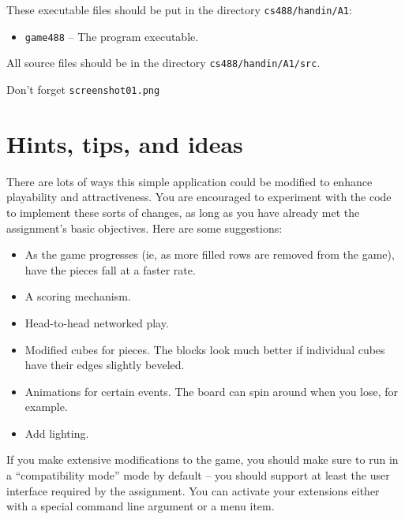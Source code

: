 These executable files should be put in the directory \texttt{cs488/handin/A1}:

\begin{itemize}
	\item \texttt{game488} -- The program executable.
\end{itemize}

All source files should be in the directory \texttt{cs488/handin/A1/src}.

Don't forget \texttt{screenshot01.png}

\section{Hints, tips, and ideas}

There are lots of ways this simple application could be modified
to enhance playability and attractiveness.  You are encouraged to
experiment with the code to implement these sorts of changes, as
long as you have already met the assignment's basic objectives.
Here are some suggestions:

\begin{itemize}
  \item As the game progresses (ie, as more filled rows are removed from
    the game), have the pieces fall at a faster rate.  

	\item A scoring mechanism.
	\item Head-to-head networked play.
	\item Modified cubes for pieces.  The blocks look much better
		  if individual cubes have their edges slightly beveled.
	\item Animations for certain events.  The board can spin around
		  when you lose, for example.
	\item Add lighting.
\end{itemize}

If you make extensive modifications to the game, you should make
sure to run in a ``compatibility mode'' mode by default -- you should
support at least the user interface required by the assignment.
You can activate your extensions either with a special command line
argument or a menu item.

\newpage
